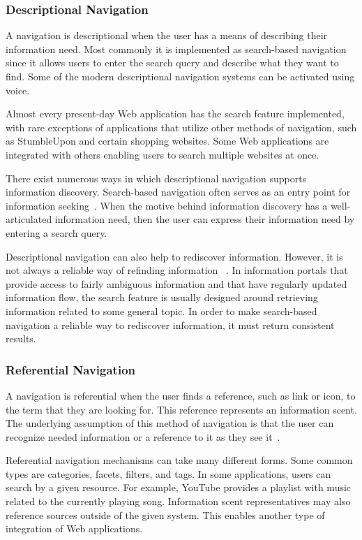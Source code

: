 {{{\subsubsection{Descriptional Navigation}
A navigation is descriptional when the user has a means of describing their information need. Most commonly it is implemented as search-based navigation since it allows users to enter the search query and describe what they want to find. Some of the modern descriptional navigation systems can be activated using voice. 

Almost every present-day Web application has the search feature implemented, with rare exceptions of applications that utilize other methods of navigation, such as StumbleUpon and certain shopping websites. Some Web applications are integrated with others enabling users to search multiple websites at once.    

There exist numerous ways in which descriptional navigation supports information discovery. Search-based navigation often serves as an entry point for information seeking~\cite{levene2011introduction}. When the motive behind information discovery has a well-articulated information need, then the user can express their information need by entering a search query. 

Descriptional navigation can also help to rediscover information. However, it is not always a reliable way of refinding information ~\cite{cockburn2003improving}. In information portals that provide access to fairly ambiguous information and that have regularly updated information flow, the search feature is usually designed around retrieving information related to some general topic. In order to make search-based navigation a reliable way to rediscover information, it must return consistent results. 
} %

{\subsubsection{Referential Navigation}
A navigation is referential when the user finds a reference, such as link or icon, to the term that they are looking for. This reference represents an information scent. The underlying assumption of this method of navigation is that the user can recognize needed information or a reference to it as they see it~\cite{waterworth1991model}. 

Referential navigation mechanisms can take many different forms. Some common types are categories, facets, filters, and tags. In some applications, users can search by a given resource. For example, YouTube provides a playlist with music related to the currently playing song. Information scent representatives may also reference sources outside of the given system. This enables another type of integration of Web applications. 

}}}
